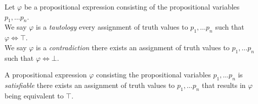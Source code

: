 \begin{definition}
    Let \(\varphi\) be a propositional expression consisting of the propositional variables \(p_1, \dots p_n\).\\
    We say \(\varphi\) is a \emph{tautology}
    \iffbydefn every assignment of truth values to \(p_1, \dots p_n\) such that \(\varphi \iff \top\).\\
    We say \(\varphi\) is a \emph{contradiction}
    \iffbydefn there exists an assignment of truth values to \(p_1, \dots p_n\) such that \(\varphi \iff \bot\).
\end{definition}
\begin{definition}[Satisfiability]
    A propositional expression \(\varphi\) consisting the propositional variables \(p_1, \dots p_n\) is \emph{satisfiable}
    \iffbydefn there exists an assignment of truth values to \(p_1, \dots p_n\) that results in \(\varphi\) being equivalent to \(\top\).
\end{definition}

\newpage

